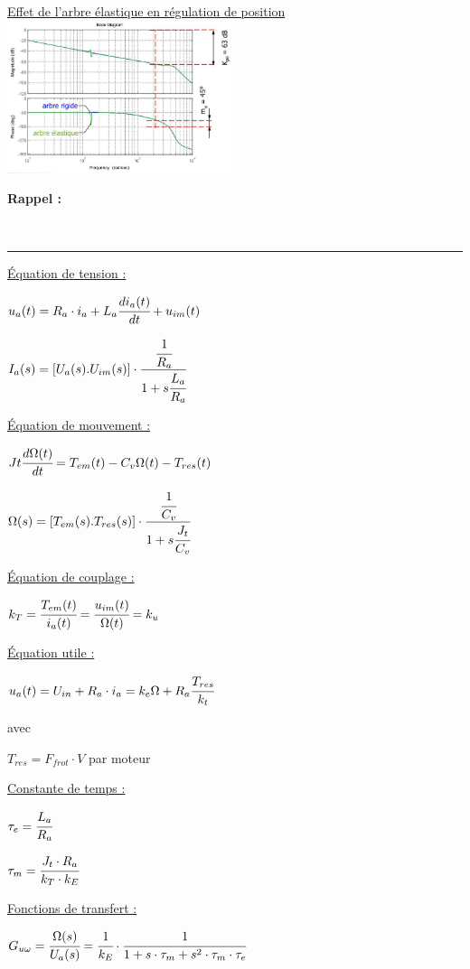 \documentclass[	DIV=calc,%
							paper=a4,%
							fontsize=10pt,%
							twocolumn]{scrartcl} %
\newcounter{mycounter}
\newcommand{\formdesc}[1]{\large\textbf{#1} \addtocounter{mycounter}{1} \hfill \themycounter \\ \vspace{-3mm} \hrule \vspace{2mm}}
\newcommand{\formtitle}[1]{\large\underline{#1}}
\begin{document}
\formtitle{Effet de l’arbre élastique en régulation de position}
\includegraphics[width=0.49\textwidth]{img/arbre_elastique_pos.JPG}


\newpage

\formdesc{Rappel : }

\formtitle{Équation de tension : }

{\hfill $u_a(t) = R_a \cdot i_a + L_a \cfrac{di_a(t)}{dt}+u_{im}(t)$\hfill}

{\hfill $I_a(s) = [U_a(s).U_{im}(s)] \cdot \cfrac{ \cfrac{1}{R_a}}{1+s\cfrac{L_a}{R_a}}  $\hfill}


\formtitle{Équation de mouvement :} 

\vspace{3mm}

{\hfill $Jt \cfrac{d\Omega(t)}{dt} = T_{em}(t) - C_v \Omega(t) - T_{res}(t) $\hfill}

{\hfill $\Omega(s) = [T_{em}(s).T_{res}(s)] \cdot \cfrac{ \cfrac{1}{C_v}}{1+s\cfrac{J_t}{C_v}}  $\hfill}

\formtitle{Équation de couplage : }

{\hfill $k_T = \cfrac{T_{em}(t)}{i_a(t)} = \cfrac{u_{im}(t)}{\Omega(t) }= k_u$\hfill}

\formtitle{Équation utile : }

{\hfill $u_a(t) = U_{in} + R_a \cdot i_a  = k_e \Omega + R_a \cfrac{T_{res}}{k_t}$\hfill}

avec 

$T_{res} = F_{frot} \cdot V$ par moteur 

\formtitle{Constante de temps  : }

{\hfill $\tau_e = \cfrac{L_a}{R_a}$\hfill}


{\hfill $\tau_m = \cfrac{J_t\cdot R_a}{k_T\cdot k_E}$\hfill}

\formtitle{Fonctions de transfert : }

\vspace{3mm}

{\hfill $G_{u\omega} = \cfrac{\Omega(s)}{U_a(s)} = \cfrac{1}{k_E}\cdot\cfrac{1}{1 + s \cdot \tau_m + s^2 \cdot \tau_m \cdot \tau_e} $\hfill}
\end{document}

